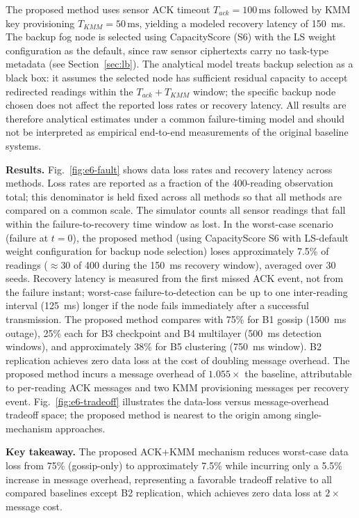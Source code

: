 \documentclass[conference]{IEEEtran}
\begin{document}
    The proposed method uses sensor ACK timeout $T_{ack}{=}100\,\text{ms}$ followed by KMM key provisioning $T_{KMM}{=}50\,\text{ms}$, yielding a modeled recovery latency of 150~ms. The backup fog node is selected using CapacityScore (S6) with the LS weight configuration as the default, since raw sensor ciphertexts carry no task-type metadata (see Section~\ref{sec:lb}). The analytical model treats backup selection as a black box: it assumes the selected node has sufficient residual capacity to accept redirected readings within the $T_{ack}+T_{KMM}$ window; the specific backup node chosen does not affect the reported loss rates or recovery latency. All results are therefore analytical estimates under a common failure-timing model and should not be interpreted as empirical end-to-end measurements of the original baseline systems.

    \textbf{Results.} Fig.~\ref{fig:e6-fault} shows data loss rates and recovery latency across methods. Loss rates are reported as a fraction of the 400-reading observation total; this denominator is held fixed across all methods so that all methods are compared on a common scale. The simulator counts all sensor readings that fall within the failure-to-recovery time window as lost. In the worst-case scenario (failure at $t{=}0$), the proposed method (using CapacityScore S6 with LS-default weight configuration for backup node selection) loses approximately 7.5\% of readings ($\approx$30 of 400 during the 150~ms recovery window), averaged over 30 seeds. Recovery latency is measured from the first missed ACK event, not from the failure instant; worst-case failure-to-detection can be up to one inter-reading interval (125~ms) longer if the node fails immediately after a successful transmission. The proposed method compares with 75\% for B1 gossip (1500~ms outage), 25\% each for B3 checkpoint and B4 multilayer (500~ms detection windows), and approximately 38\% for B5 clustering (750~ms window). B2 replication achieves zero data loss at the cost of doubling message overhead. The proposed method incurs a message overhead of $1.055\times$ the baseline, attributable to per-reading ACK messages and two KMM provisioning messages per recovery event. Fig.~\ref{fig:e6-tradeoff} illustrates the data-loss versus message-overhead tradeoff space; the proposed method is nearest to the origin among single-mechanism approaches.

    \textbf{Key takeaway.} The proposed ACK+KMM mechanism reduces worst-case data loss from 75\% (gossip-only) to approximately 7.5\% while incurring only a 5.5\% increase in message overhead, representing a favorable tradeoff relative to all compared baselines except B2 replication, which achieves zero data loss at $2\times$ message cost.
\end{document}
